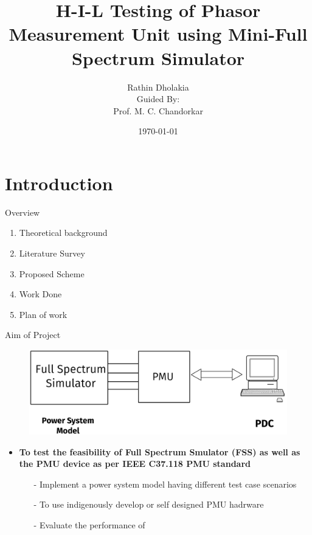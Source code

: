\documentclass{beamer}
\title{ H-I-L Testing of Phasor Measurement Unit using Mini-Full Spectrum Simulator}
\date{\today}
\author{Rathin Dholakia \\Guided By:\\ Prof. M. C. Chandorkar}
\institute{MTP Stage - 1}
\begin{document}
  \maketitle
  \section{Introduction}


  \begin{frame}{Overview}
 	\begin{enumerate}
  	\item Theoretical background
  	\item Literature Survey
  	\item Proposed Scheme
  	\item Work Done
  	\item Plan of work
 	\end{enumerate}
   \end{frame}
 
 
 \begin{frame}{Aim of Project}
 \begin{figure}
 \includegraphics*[scale=0.1]{Aim.png}
 \end{figure}
 \begin{itemize}
 \item \textbf{To test the feasibility of Full Spectrum Smulator (FSS) as well as the PMU device as per IEEE C37.118 PMU standard}
 \begin{itemize}
	 \item[-] Implement a power system model having different test case scenarios
  	\item[-] To use indigenously develop or self designed PMU hadrware
	 \item[-] Evaluate the performance of
 \end{itemize}
 
 \end{itemize}
 \end{frame} 
 
\end{document}
